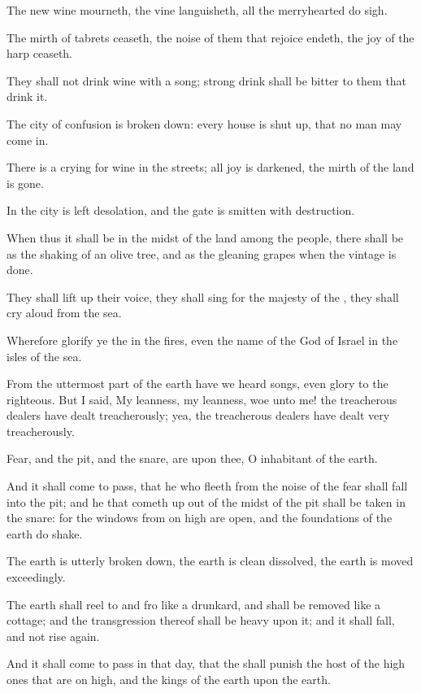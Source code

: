 \Verse The new wine mourneth, the vine languisheth, all the merryhearted do sigh.

\Verse The mirth of tabrets ceaseth, the noise of them that rejoice endeth, the joy of the harp ceaseth.

\Verse They shall not drink wine with a song; strong drink shall be bitter to them that drink it.

\Verse The city of confusion is broken down: every house is shut up, that no man may come in.

\Verse There is a crying for wine in the streets; all joy is darkened, the mirth of the land is gone.

\Verse In the city is left desolation, and the gate is smitten with destruction.

\Verse When thus it shall be in the midst of the land among the people, there shall be as the shaking of an olive tree, and as the gleaning grapes when the vintage is done.

\Verse They shall lift up their voice, they shall sing for the majesty of the \LORD, they shall cry aloud from the sea.

\Verse Wherefore glorify ye the \LORD in the fires, even the name of the \LORD God of Israel in the isles of the sea.

\Verse From the uttermost part of the earth have we heard songs, even glory to the righteous. But I said, My leanness, my leanness, woe unto me! the treacherous dealers have dealt treacherously; yea, the treacherous dealers have dealt very treacherously.

\Verse Fear, and the pit, and the snare, are upon thee, O inhabitant of the earth.

\Verse And it shall come to pass, that he who fleeth from the noise of the fear shall fall into the pit; and he that cometh up out of the midst of the pit shall be taken in the snare: for the windows from on high are open, and the foundations of the earth do shake.

\Verse The earth is utterly broken down, the earth is clean dissolved, the earth is moved exceedingly.

\Verse The earth shall reel to and fro like a drunkard, and shall be removed like a cottage; and the transgression thereof shall be heavy upon it; and it shall fall, and not rise again.

\Verse And it shall come to pass in that day, that the \LORD shall punish the host of the high ones that are on high, and the kings of the earth upon the earth.

